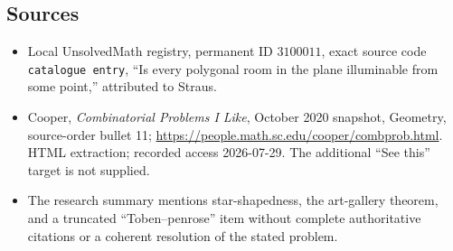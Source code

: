 \documentclass[11pt]{article}
\begin{document}
\subsection{Sources}
\begin{itemize}
\item Local UnsolvedMath registry, permanent ID \(3100011\), exact source code \texttt{catalogue entry}, ``Is every polygonal room in the plane illuminable from some point,'' attributed to Straus.
\item Cooper, \emph{Combinatorial Problems I Like}, October 2020 snapshot, Geometry, source-order bullet 11; \url{https://people.math.sc.edu/cooper/combprob.html}. HTML extraction; recorded access 2026-07-29. The additional ``See this'' target is not supplied.
\item The research summary mentions star-shapedness, the art-gallery theorem, and a truncated ``Toben--penrose'' item without complete authoritative citations or a coherent resolution of the stated problem.
\end{itemize}
\end{document}
